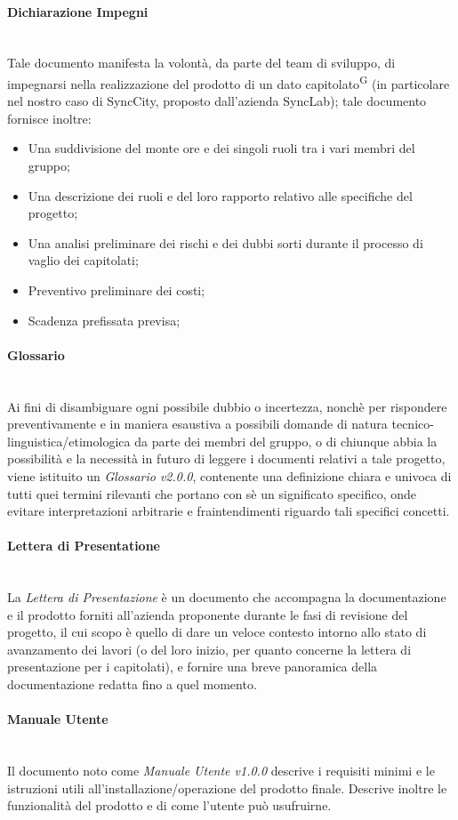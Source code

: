 \documentclass[8pt]{article}
\newcommand{\glossterm}[1]{#1\textsuperscript{G}} %
\newcommand{\subsubsubsection}[1]{\paragraph{#1}\mbox{}\\}
\begin{document}
\subsubsubsection{Dichiarazione Impegni}
Tale documento manifesta la volontà, da parte del team di sviluppo, di impegnarsi nella realizzazione del prodotto di un dato \glossterm{capitolato} (in particolare nel nostro caso di SyncCity, proposto dall'azienda SyncLab); tale documento fornisce inoltre:
\begin{itemize}
    \item Una suddivisione del monte ore e dei singoli ruoli tra i vari membri del gruppo;
    \item Una descrizione dei ruoli e del loro rapporto relativo alle specifiche del progetto;
    \item Una analisi preliminare dei rischi e dei dubbi sorti durante il processo di vaglio dei capitolati;
    \item Preventivo preliminare dei costi;
    \item Scadenza prefissata previsa;
\end{itemize}

\subsubsubsection{Glossario}
Ai fini di disambiguare ogni possibile dubbio o incertezza, nonchè per rispondere preventivamente e
in maniera esaustiva a possibili domande di natura tecnico-linguistica/etimologica da parte dei
membri del gruppo, o di chiunque abbia la possibilità e la necessità in futuro di leggere i
documenti relativi a tale progetto, viene istituito un \textit{Glossario v2.0.0}, contenente una definizione chiara e univoca di tutti quei termini rilevanti che portano con sè un significato specifico, onde evitare interpretazioni arbitrarie e fraintendimenti riguardo tali specifici concetti.

\subsubsubsection{Lettera di Presentatione}
La \textit{Lettera di Presentazione} è un documento che accompagna la documentazione e il prodotto forniti all'azienda proponente durante le fasi di revisione del progetto, il cui scopo è quello di dare un veloce contesto intorno allo stato di avanzamento dei lavori (o del loro inizio, per quanto concerne la lettera di presentazione per i capitolati), e fornire una breve panoramica della documentazione redatta fino a quel momento. 

\subsubsubsection{Manuale Utente}
Il documento noto come \textit{Manuale Utente v1.0.0} descrive i requisiti minimi e le istruzioni utili all'installazione/operazione del prodotto finale. Descrive inoltre le funzionalità del prodotto e di come l'utente può usufruirne.
\end{document}
